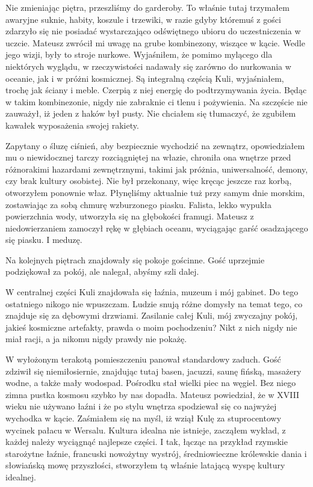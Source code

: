 Nie zmieniając piętra, przeszliśmy do garderoby.
To właśnie tutaj trzymałem awaryjne suknie, habity, koszule i trzewiki, w razie gdyby któremuś z gości zdarzyło się nie posiadać wystarczająco odświętnego ubioru do uczestniczenia w uczcie.
Mateusz zwrócił mi uwagę na grube kombinezony, wiszące w kącie. Wedle jego wizji, były to stroje nurkowe.
Wyjaśniłem, że pomimo mylącego dla niektórych wyglądu, w rzeczywistości nadawały się zarówno do nurkowania w oceanie, jak i w próżni kosmicznej.
Są integralną częścią Kuli, wyjaśniałem, trochę jak ściany i meble. Czerpią z niej energię do podtrzymywania życia. 
Będąc w takim kombinezonie, nigdy nie zabraknie ci tlenu i pożywienia.
Na szczęście nie zauważył, iż jeden z haków był pusty. Nie chciałem się tłumaczyć, że zgubiłem kawałek wyposażenia swojej rakiety.

Zapytany o śluzę ciśnień, aby bezpiecznie wychodzić na zewnątrz, opowiedziałem mu o niewidocznej tarczy rozciągniętej na włazie, chroniła ona wnętrze przed różnorakimi hazardami zewnętrznymi, takimi jak próżnia, uniwersalność, demony, czy brak kultury osobistej.
Nie był przekonany, więc kręcąc jeszcze raz korbą, otworzyłem ponownie właz. 
Płynęliśmy aktualnie tuż przy samym dnie morskim, zostawiając za sobą chmurę wzburzonego piasku.
Falista, lekko wypukła powierzchnia wody, utworzyła się na głębokości framugi. 
Mateusz z niedowierzaniem zamoczył rękę w głębiach oceanu, wyciągając garść osadzającego się piasku.
I meduzę.

Na kolejnych piętrach znajdowały się pokoje gościnne. Gość uprzejmie podziękował za pokój, ale nalegał, abyśmy szli dalej.

W centralnej części Kuli znajdowała się łaźnia, muzeum i mój gabinet. Do tego ostatniego nikogo nie wpuszczam.
Ludzie snują różne domysły na temat tego, co znajduje się za dębowymi drzwiami. 
Zasilanie całej Kuli, mój zwyczajny pokój, jakieś kosmiczne artefakty, prawda o moim pochodzeniu?
Nikt z nich nigdy nie miał racji, a ja nikomu nigdy prawdy nie pokażę.

W wyłożonym terakotą pomieszczeniu panował standardowy zaduch. Gość zdziwił się niemiłosiernie, znajdując tutaj basen, jacuzzi, saunę fińską, masażery wodne, a także mały wodospad.
Pośrodku stał wielki piec na węgiel. Bez niego zimna pustka kosmosu szybko by nas dopadła.
Mateusz powiedział, że w XVIII wieku nie używano łaźni i że po stylu wnętrza spodziewał się co najwyżej wychodka w kącie. 
Zaśmiałem się na myśl, iż wziął Kulę za stuprocentowy wycinek pałacu w Wersalu.
Kultura idealna nie istnieje, zacząłem wykład, z każdej należy wyciągnąć najlepsze części. 
I tak, łącząc na przykład rzymskie starożytne łaźnie, francuski nowożytny wystrój, średniowieczne królewskie dania i słowiańską mowę przyszłości, 
stworzyłem tą właśnie latającą wyspę kultury idealnej.

